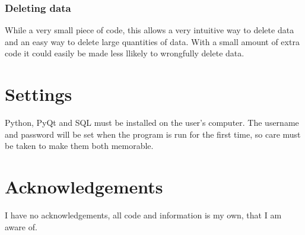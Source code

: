 \subsubsection{Deleting data}

While a very small piece of code, this allows a very intuitive way to delete data and an easy way to delete large quantities of data. With a small amount of extra code it could easily be made less llikely to wrongfully delete data.


\section{Settings}

Python, PyQt and SQL must be installed on the user's computer. The username and password will be set when the program is run for the first time, so care must be taken to make them both memorable.

\section{Acknowledgements}

I have no acknowledgements, all code and information is my own, that I am aware of.

